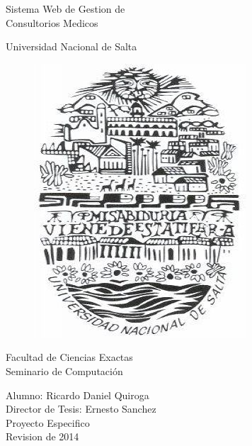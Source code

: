
%


\begin{titlepage}


\begin{center}
    {\fontsize{45}{45} \selectfont 
    Sistema Web de Gestion de \\ Consultorios Medicos \\[2.3cm] }
\end{center}


\begin{center}
    \LARGE Universidad Nacional de Salta \\
    \begin{figure}[h]
        \begin{center}
        \includegraphics[scale=0.5]{resourse/logo-UNSa.jpg}
        \end{center}
    \end{figure}

    
    \LARGE Facultad de Ciencias Exactas \\
    Seminario de Computaci\'on \\ [2.3cm]
\end{center}


\begin{flushright}
    \Large Alumno: Ricardo Daniel Quiroga \\
    Director de Tesis: Ernesto Sanchez \\
    Proyecto Especifico \\ 
    {Revision} de 2014 
    
    
\end{flushright}



\end{titlepage}


